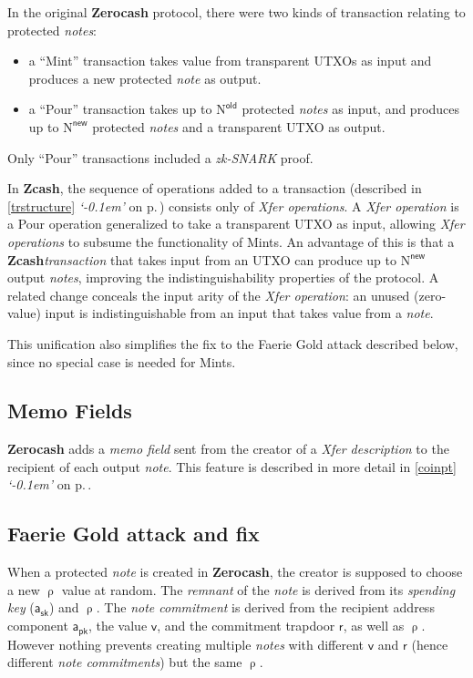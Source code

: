 \documentclass{article}
\newcommand{\crossref}[1]{\autoref{#1} \emph{`\nameref*{#1}\kern -0.1em'} on p.\,\pageref*{#1}}
\newcommand{\term}[1]{\textsl{#1}\xspace}
\newcommand{\titleterm}[1]{#1\xspace}
\newcommand{\termbf}[1]{\textbf{#1}\xspace}
\newcommand{\Zcash}{\termbf{Zcash}}
\newcommand{\Zerocash}{\termbf{Zerocash}}
\newcommand{\coin}{\term{note}}
\newcommand{\coins}{\term{notes}}
\newcommand{\coinCommitment}{\term{note commitment}}
\newcommand{\coinCommitments}{\term{note commitments}}
\newcommand{\pourDescription}{\term{Xfer description}}
\newcommand{\pourTransfer}{\term{Xfer operation}}
\newcommand{\pourTransfers}{\term{Xfer operations}}
\newcommand{\transaction}{\term{transaction}}
\newcommand{\serialNumber}{\term{remnant}}
\newcommand{\spendingKey}{\term{spending key}}
\newcommand{\zkSNARK}{\term{zk-SNARK}}
\newcommand{\memo}{\term{memo field}}
\newcommand{\Memos}{\titleterm{Memo Fields}}
\newcommand{\AuthPublic}{\mathsf{a_{pk}}}
\newcommand{\AuthPrivate}{\mathsf{a_{sk}}}
\newcommand{\Value}{\mathsf{v}}
\newcommand{\CoinCommitRand}{\mathsf{r}}
\newcommand{\CoinAddressRand}{\mathsf{\uprho}}
\newcommand{\NOld}{\mathrm{N}^\mathsf{old}}
\newcommand{\NNew}{\mathrm{N}^\mathsf{new}}
\begin{document}
In the original \Zerocash protocol, there were two kinds of transaction
relating to protected \coins:
\begin{itemize}
  \item a ``Mint'' transaction takes value from transparent UTXOs as
input and produces a new protected \coin as output.
  \item a ``Pour'' transaction takes up to $\NOld$ protected
\coins as input, and produces up to $\NNew$ protected \coins and a
transparent UTXO as output.
\end{itemize}

Only ``Pour'' transactions included a \zkSNARK proof.

In \Zcash, the sequence of operations added to a transaction
(described in \crossref{trstructure}) consists only of \pourTransfers.
A \pourTransfer is a Pour operation generalized to take a transparent
UTXO as input, allowing \pourTransfers to subsume the functionality of
Mints. An advantage of this is that a \Zcash \transaction that takes
input from an UTXO can produce up to $\NNew$ output \coins, improving
the indistinguishability properties of the protocol. A related change
conceals the input arity of the \pourTransfer: an unused (zero-value)
input is indistinguishable from an input that takes value from a \coin.

This unification also simplifies the fix to the Faerie Gold attack
described below, since no special case is needed for Mints.


\subsection{\Memos}

\Zerocash adds a \memo sent from the creator of a \pourDescription to
the recipient of each output \coin. This feature is described in
more detail in \crossref{coinpt}.


\subsection{Faerie Gold attack and fix}

When a protected \coin is created in \Zerocash, the creator is
supposed to choose a new $\CoinAddressRand$ value at random.
The \serialNumber of the \coin is derived from its \spendingKey
($\AuthPrivate$) and $\CoinAddressRand$. The \coinCommitment
is derived from the recipient address component $\AuthPublic$,
the value $\Value$, and the commitment trapdoor $\CoinCommitRand$,
as well as $\CoinAddressRand$. However nothing prevents creating
multiple \coins with different $\Value$ and $\CoinCommitRand$
(hence different \coinCommitments) but the same $\CoinAddressRand$.
\end{document}
